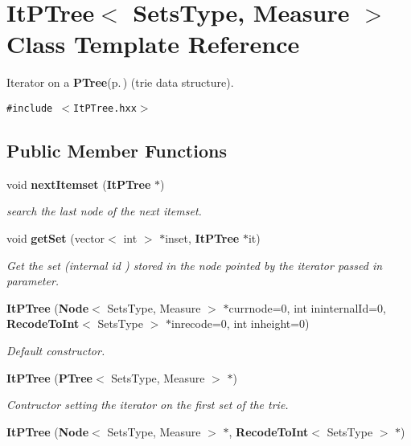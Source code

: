 \section{It\-PTree$<$ Sets\-Type, Measure $>$ Class Template Reference}
\label{class_it_p_tree}
Iterator on a {\bf PTree}{\rm (p.\,\pageref{class_p_tree})} (trie data structure).  


{\tt \#include $<$It\-PTree.hxx$>$}

\subsection*{Public Member Functions}
\begin{CompactItemize}
\item 
void {\bf next\-Itemset} ({\bf It\-PTree} $\ast$)\label{class_it_p_tree_00480e1f67fe1114bd8ea3811dba2c63}

\begin{CompactList}\small\item\em search the last node of the next itemset. \item\end{CompactList}\item 
void {\bf get\-Set} (vector$<$ int $>$ $\ast$inset, {\bf It\-PTree} $\ast$it)
\begin{CompactList}\small\item\em Get the set (internal id ) stored in the node pointed by the iterator passed in parameter. \item\end{CompactList}\item 
{\bf It\-PTree} ({\bf Node}$<$ Sets\-Type, Measure $>$ $\ast$currnode=0, int ininternal\-Id=0, {\bf Recode\-To\-Int}$<$ Sets\-Type $>$ $\ast$inrecode=0, int inheight=0)\label{class_it_p_tree_b45ae5524947493010acbcdc17b5889d}

\begin{CompactList}\small\item\em Default constructor. \item\end{CompactList}\item 
{\bf It\-PTree} ({\bf PTree}$<$ Sets\-Type, Measure $>$ $\ast$)\label{class_it_p_tree_794673b75fe375180e69425c1342aa46}

\begin{CompactList}\small\item\em Contructor setting the iterator on the first set of the trie. \item\end{CompactList}\item 
{\bf It\-PTree} ({\bf Node}$<$ Sets\-Type, Measure $>$ $\ast$, {\bf Recode\-To\-Int}$<$ Sets\-Type $>$ $\ast$)\label{class_it_p_tree_e31d719e378bd26422db9ef26e6e2f34}


\end{CompactItemize}
